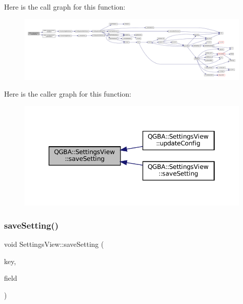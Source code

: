 Here is the call graph for this function\+:
\nopagebreak
\begin{figure}[H]
\begin{center}
\leavevmode
\includegraphics[width=350pt]{class_q_g_b_a_1_1_settings_view_a19415746baafd248bbfa3881de875d4f_cgraph}
\end{center}
\end{figure}
Here is the caller graph for this function\+:
\nopagebreak
\begin{figure}[H]
\begin{center}
\leavevmode
\includegraphics[width=346pt]{class_q_g_b_a_1_1_settings_view_a19415746baafd248bbfa3881de875d4f_icgraph}
\end{center}
\end{figure}
\mbox{\label{class_q_g_b_a_1_1_settings_view_afaeb044782f267409f0ef9c9c107cf1c}} 
\subsubsection{\texorpdfstring{save\+Setting()}{saveSetting()}\hspace{0.1cm}{\footnotesize\ttfamily [2/7]}}
{\footnotesize\ttfamily void Settings\+View\+::save\+Setting (\begin{DoxyParamCaption}\item[{const char $\ast$}]{key,  }\item[{const Q\+Combo\+Box $\ast$}]{field }\end{DoxyParamCaption})\hspace{0.3cm}{\ttfamily [private]}}

